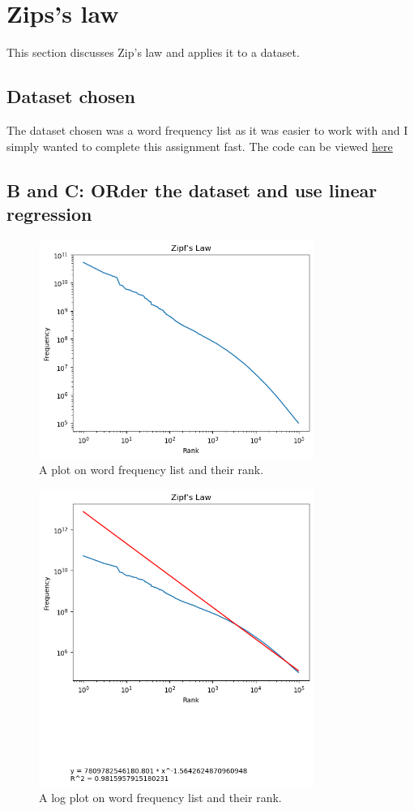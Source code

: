 \documentclass[a4paper,11pt]{article}
\begin{document}
\section{Zips's law}

This section discusses Zip's law and applies it to a dataset. 
\subsection{Dataset chosen}
The dataset chosen was a word frequency list as it was easier to work with and I simply wanted to complete this assignment fast. The code can be viewed \href{https://github.com/RakinAli/Homework-3---DA2210/tree/main}{here}
\newpage

\subsection{B and C: ORder the dataset and use linear regression}

\begin{figure}
    \centering
    \label{fig:word-freq}
    \includegraphics[width=0.8\textwidth]{wordfreq.png}
    \caption{A plot on word frequency list and their rank.}
\end{figure}

\begin{figure}[h]
    \centering
    \label{fig:word-freq-log}
    \includegraphics[width=0.8\textwidth]{graph.png}
    \caption{A log plot on word frequency list and their rank.}
    \label{fig:my_label}
\end{figure}




\printbibliography
\end{document}
